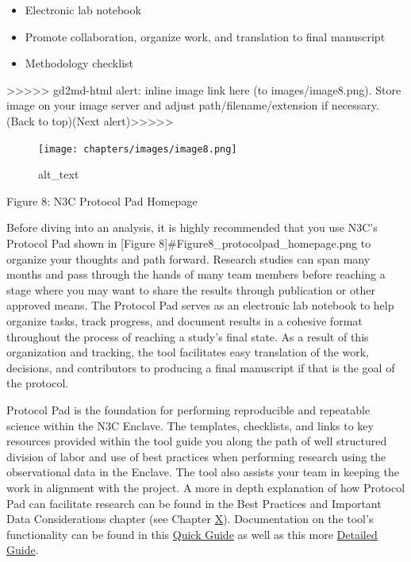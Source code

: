 \documentclass[
  letterpaper,
  DIV=11,
  numbers=noendperiod]{scrreprt}
\providecommand{\tightlist}{%
  \setlength{\itemsep}{0pt}\setlength{\parskip}{0pt}}\usepackage{longtable,booktabs,array}
\begin{document}
\begin{itemize}
\tightlist
\item
  Electronic lab notebook
\item
  Promote collaboration, organize work, and translation to final
  manuscript
\item
  Methodology checklist
\end{itemize}

{\textgreater\textgreater\textgreater\textgreater\textgreater{}
gd2md-html alert: inline image link here (to images/image8.png). Store
image on your image server and adjust path/filename/extension if
necessary. }(Back to top)(Next
alert){\textgreater\textgreater\textgreater\textgreater\textgreater{} }

\begin{figure}

{\centering \texttt{[image: chapters/images/image8.png]}

}

\caption{alt\_text}

\end{figure}

Figure 8: N3C Protocol Pad Homepage

Before diving into an analysis, it is highly recommended that you use
N3C's Protocol Pad shown in {[}Figure
8{]}\#Figure8\_protocolpad\_homepage.png to organize your thoughts and
path forward. Research studies can span many months and pass through the
hands of many team members before reaching a stage where you may want to
share the results through publication or other approved means. The
Protocol Pad serves as an electronic lab notebook to help organize
tasks, track progress, and document results in a cohesive format
throughout the process of reaching a study's final state. As a result of
this organization and tracking, the tool facilitates easy translation of
the work, decisions, and contributors to producing a final manuscript if
that is the goal of the protocol.

Protocol Pad is the foundation for performing reproducible and
repeatable science within the N3C Enclave. The templates, checklists,
and links to key resources provided within the tool guide you along the
path of well structured division of labor and use of best practices when
performing research using the observational data in the Enclave. The
tool also assists your team in keeping the work in alignment with the
project. A more in depth explanation of how Protocol Pad can facilitate
research can be found in the Best Practices and Important Data
Considerations chapter (see Chapter
\protect\hyperlink{Bestux5cux2520Practices-and-Important-Data-Considerations}{X}).
Documentation on the tool's functionality can be found in this
\href{https://unite.nih.gov/workspace/notepad/view/ri.notepad.main.notepad.8e97750f-d764-4df9-bb25-42ab32fcaa26}{Quick
Guide} as well as this more
\href{https://unite.nih.gov/workspace/notepad/view/ri.notepad.main.notepad.9d509aa3-7c76-42b3-a891-076a6f450f37}{Detailed
Guide}.
\end{document}

